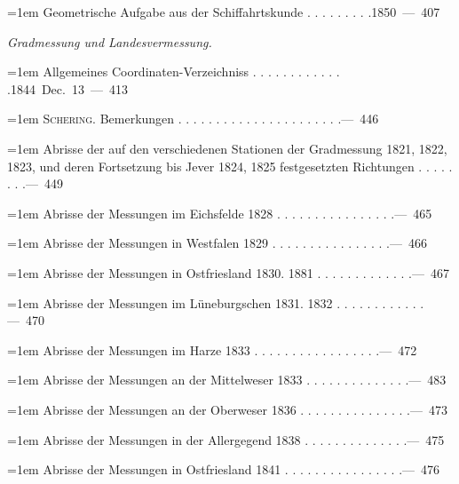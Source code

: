 \par\noindent\hangindent=1em Geometrische Aufgabe aus der Schiffahrtskunde . . . . . . . . .\hfill{}\hbox{}\nobreak\hfill\mbox{1850 — 407}\par
\par\medskip{}
\noindent\textit{Gradmessung und Landesvermessung.}\par
\par\noindent\hangindent=1em Allgemeines Coordinaten-Verzeichniss . . . . . . . . . . . . .\hfill{}\hbox{}\nobreak\hfill\mbox{1844 Dec. 13 — 413}\par
\par\noindent\hangindent=1em \textsc{Schering}. Bemerkungen . . . . . . . . . . . . . . . . . . . . . .\hfill{}\hbox{}\nobreak\hfill\mbox{— 446}\par
\par\noindent\hangindent=1em Abrisse der auf den verschiedenen Stationen der Gradmessung 1821, 1822, 1823, und deren Fortsetzung bis Jever 1824, 1825 festgesetzten Richtungen . . . . . . . .\hfill{}\hbox{}\nobreak\hfill\mbox{— 449}\par
\par\noindent\hangindent=1em Abrisse der Messungen im Eichsfelde 1828 . . . . . . . . . . . . . . . .\hfill{}\hbox{}\nobreak\hfill\mbox{— 465}\par
\par\noindent\hangindent=1em Abrisse der Messungen in Westfalen 1829 . . . . . . . . . . . . . . . .\hfill{}\hbox{}\nobreak\hfill\mbox{— 466}\par
\par\noindent\hangindent=1em Abrisse der Messungen in Ostfriesland 1830. 1881 . . . . . . . . . . . . .\hfill{}\hbox{}\nobreak\hfill\mbox{— 467}\par
\par\noindent\hangindent=1em Abrisse der Messungen im Lüneburgschen 1831. 1832 . . . . . . . . . . . .\hfill{}\hbox{}\nobreak\hfill\mbox{— 470}\par
\par\noindent\hangindent=1em Abrisse der Messungen im Harze 1833 . . . . . . . . . . . . . . . . .\hfill{}\hbox{}\nobreak\hfill\mbox{— 472}\par
\par\noindent\hangindent=1em Abrisse der Messungen an der Mittelweser 1833 . . . . . . . . . . . . . .\hfill{}\hbox{}\nobreak\hfill\mbox{— 483}\par
\par\noindent\hangindent=1em Abrisse der Messungen an der Oberweser 1836 . . . . . . . . . . . . . . .\hfill{}\hbox{}\nobreak\hfill\mbox{— 473}\par
\par\noindent\hangindent=1em Abrisse der Messungen in der Allergegend 1838 . . . . . . . . . . . . . .\hfill{}\hbox{}\nobreak\hfill\mbox{— 475}\par
\par\noindent\hangindent=1em Abrisse der Messungen in Ostfriesland 1841 . . . . . . . . . . . . . . . .\hfill{}\hbox{}\nobreak\hfill\mbox{— 476}\par
\endgroup
